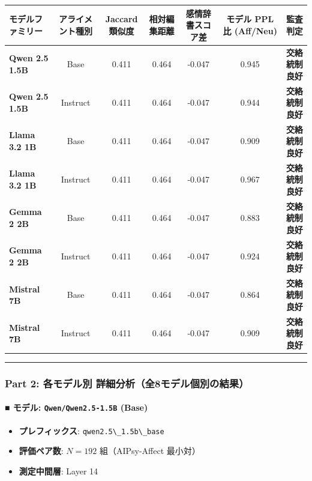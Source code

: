 \begin{center}
\small
\begin{tabular}{lcccccc}
\toprule
\textbf{モデルファミリー} & \textbf{アライメント種別} & \textbf{Jaccard 類似度} & \textbf{相対編集距離} & \textbf{感情辞書スコア差} & \textbf{モデル PPL 比 (Aff/Neu)} & \textbf{監査判定} \\
\midrule
\textbf{Qwen 2.5 1.5B} & Base & 0.411 & 0.464 & -0.047 & 0.945 & \textbf{交絡統制良好} \\
\textbf{Qwen 2.5 1.5B} & Instruct & 0.411 & 0.464 & -0.047 & 0.944 & \textbf{交絡統制良好} \\
\textbf{Llama 3.2 1B} & Base & 0.411 & 0.464 & -0.047 & 0.909 & \textbf{交絡統制良好} \\
\textbf{Llama 3.2 1B} & Instruct & 0.411 & 0.464 & -0.047 & 0.967 & \textbf{交絡統制良好} \\
\textbf{Gemma 2 2B} & Base & 0.411 & 0.464 & -0.047 & 0.883 & \textbf{交絡統制良好} \\
\textbf{Gemma 2 2B} & Instruct & 0.411 & 0.464 & -0.047 & 0.924 & \textbf{交絡統制良好} \\
\textbf{Mistral 7B} & Base & 0.411 & 0.464 & -0.047 & 0.864 & \textbf{交絡統制良好} \\
\textbf{Mistral 7B} & Instruct & 0.411 & 0.464 & -0.047 & 0.909 & \textbf{交絡統制良好} \\
\bottomrule
\end{tabular}
\end{center}


\vspace{0.5em}\hrule\vspace{0.5em}

\subsubsection{Part 2: 各モデル別 詳細分析（全8モデル個別の結果）}

\paragraph{■ モデル: \texttt{Qwen/Qwen2.5-1.5B} (Base)}
\begin{itemize}
\item \textbf{プレフィックス}: \texttt{qwen2.5\textbackslash{}\_1.5b\textbackslash{}\_base}
\item \textbf{評価ペア数}: $N=192$ 組（AIPsy-Affect 最小対）
\item \textbf{測定中間層}: Layer 14
\end{itemize}


